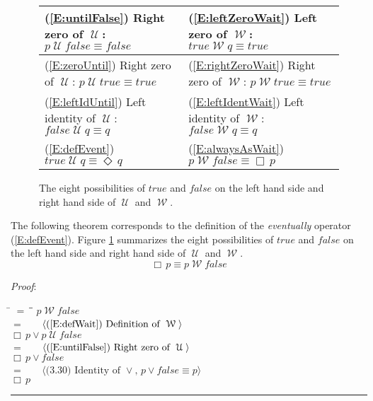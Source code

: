 \documentclass[12pt, fleqn, leqno]{article}
\newcommand{\lgap}{2pt}                             %
\newcommand{\mymathindent}{24pt}                    %
\newcommand{\Until}{\;\mathcal{U}\;}
\newcommand{\Wait}{\;\mathcal{W}\;}
\newcommand{\Event}{\Diamond\,}
\newcommand{\Always}{\Box\,}
\newcommand{\myqed}{\rule[-.23ex]{1.2ex}{2.0ex}}
\newcommand{\myqedtab}{\hspace{384pt}}              %
\newcommand{\Gll} {\langle}                         %
\newcommand{\Ggg} {\rangle}                         %
\newcommand{\Hint}[1]     {\ \ \ $\Gll              \mbox{#1} \Ggg$ }   %
\begin{document}
\begin{figure}[t]
\centering
\renewcommand\arraystretch{1.2}
\begin{tabular}{ l l }
  \toprule
  (\ref{E:untilFalse}) Right zero of $\Until$:\; $p \Until false \equiv false$
  &
  (\ref{E:leftZeroWait}) Left zero of $\Wait$:\; $true \Wait q \equiv true$ \\
  \midrule
  (\ref{E:zeroUntil}) Right zero of $\Until$:\; $p \Until true \equiv true$
  &
  (\ref{E:rightZeroWait}) Right zero of $\Wait$:\; $p \Wait true \equiv true$ \\
  \midrule
  (\ref{E:leftIdUntil}) Left identity of $\Until$:\; $false \Until q \equiv q$
  &
  (\ref{E:leftIdentWait}) Left identity of $\Wait$:\; $false \Wait q \equiv q$ \\
  \midrule
  (\ref{E:defEvent}) $true \Until q \equiv \Event q$
  &
  (\ref{E:alwaysAsWait}) $p \Wait false\equiv \Always p$ \\
  \bottomrule
\end{tabular}
\renewcommand\arraystretch{1}
\caption{The eight possibilities of $true$ and $false$ on the left hand side and right hand side of $\Until$ and $\Wait$.
\label{true-false-wait-until}}
\end{figure}

The following theorem corresponds to the definition of the \textit{eventually} operator (\ref{E:defEvent}).
Figure \ref{true-false-wait-until} summarizes the eight possibilities of $true$ and $false$ on the left hand side and right hand side of $\Until$ and $\Wait$.
\begin{equation}\label{E:alwaysAsWait}
\Always p \equiv p \Wait false
\end{equation}

\emph{Proof}:
\begin{tabbing}
\hspace{\mymathindent} \= $= \;$ \= \myqedtab \= \kill
\> \> $p \Wait false$\\[\lgap]
\> $=$ \> \Hint{(\ref{E:defWait}) Definition of $\Wait$} \\[\lgap]
\> \> $\Always p\lor p \Until false$\\[\lgap]
\> $=$ \> \Hint{(\ref{E:untilFalse}) Right zero of $\Until$} \\[\lgap]
\> \> $\Always p\lor false$\\[\lgap]
\> $=$ \> \Hint{(3.30) Identity of $\lor$, $p\lor false\equiv p$} \\[\lgap]
\> \> $\Always p$ \quad \myqed
\end{tabbing}
\end{document}
